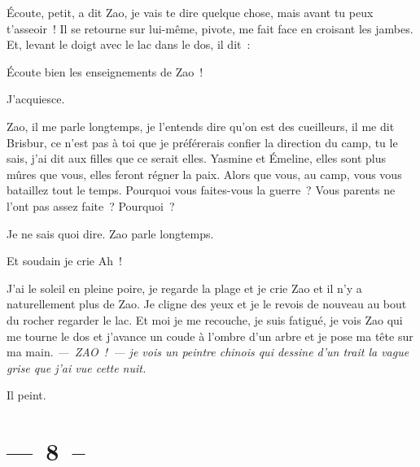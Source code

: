 \documentclass[french,twoside]{book} %
\begin{document}
\par
\bigbreak
\noindent Écoute, petit, a dit Zao, je vais te dire quelque chose, mais avant tu peux t’asseoir ! Il se retourne sur lui-même, pivote, me fait face en croisant les jambes. Et, levant le doigt avec le lac dans le dos, il dit :\par
Écoute bien les enseignements de Zao !\par
J’acquiesce.\par
Zao, il me parle longtemps, je l’entends dire qu’on est des cueilleurs, il me dit Brisbur, ce n’est pas à toi que je préférerais confier la direction du camp, tu le sais, j’ai dit aux filles que ce serait elles. Yasmine et Émeline, elles sont plus mûres que vous, elles feront régner la paix. Alors que vous, au camp, vous vous bataillez tout le temps. Pourquoi vous faites-vous la guerre ? Vous parents ne l’ont pas assez faite ? Pourquoi ?\par
Je ne sais quoi dire. Zao parle longtemps.\par
Et soudain je crie Ah !\par
J’ai le soleil en pleine poire, je regarde la plage et je crie Zao et il n’y a naturellement plus de Zao. Je cligne des yeux et je le revois de nouveau au bout du rocher regarder le lac. Et moi je me recouche, je suis fatigué, je vois Zao qui me tourne le dos et j’avance un coude à l’ombre d’un arbre et je pose ma tête sur ma main. \emph{— ZAO ! — je vois un peintre chinois qui dessine d’un trait la vague grise que j’ai vue cette nuit.}\par
Il peint.
\section[{— 8 –}]{— 8 –}\renewcommand{\leftmark}{— 8 –}
\end{document}
